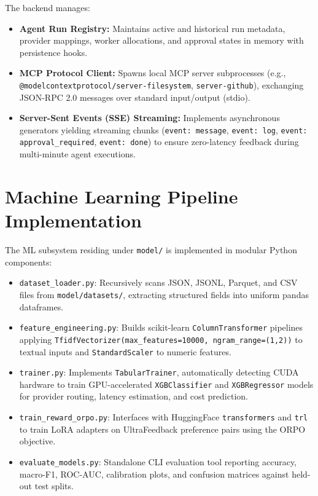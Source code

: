 \documentclass[12pt,a4paper]{report}
\begin{document}
The backend manages:
\begin{itemize}
    \item \textbf{Agent Run Registry:} Maintains active and historical run metadata, provider mappings, worker allocations, and approval states in memory with persistence hooks.
    \item \textbf{MCP Protocol Client:} Spawns local MCP server subprocesses (e.g., \texttt{@modelcontextprotocol/server-filesystem}, \texttt{server-github}), exchanging JSON-RPC 2.0 messages over standard input/output (stdio).
    \item \textbf{Server-Sent Events (SSE) Streaming:} Implements asynchronous generators yielding streaming chunks (\texttt{event: message}, \texttt{event: log}, \texttt{event: approval\_required}, \texttt{event: done}) to ensure zero-latency feedback during multi-minute agent executions.
\end{itemize}

\section{Machine Learning Pipeline Implementation}
The ML subsystem residing under \texttt{model/} is implemented in modular Python components:
\begin{itemize}
    \item \texttt{dataset\_loader.py}: Recursively scans JSON, JSONL, Parquet, and CSV files from \texttt{model/datasets/}, extracting structured fields into uniform pandas dataframes.
    \item \texttt{feature\_engineering.py}: Builds scikit-learn \texttt{ColumnTransformer} pipelines applying \texttt{TfidfVectorizer(max\_features=10000, ngram\_range=(1,2))} to textual inputs and \texttt{StandardScaler} to numeric features.
    \item \texttt{trainer.py}: Implements \texttt{TabularTrainer}, automatically detecting CUDA hardware to train GPU-accelerated \texttt{XGBClassifier} and \texttt{XGBRegressor} models for provider routing, latency estimation, and cost prediction.
    \item \texttt{train\_reward\_orpo.py}: Interfaces with HuggingFace \texttt{transformers} and \texttt{trl} to train LoRA adapters on UltraFeedback preference pairs using the ORPO objective.
    \item \texttt{evaluate\_models.py}: Standalone CLI evaluation tool reporting accuracy, macro-F1, ROC-AUC, calibration plots, and confusion matrices against held-out test splits.
\end{itemize}
\end{document}

